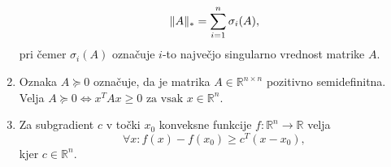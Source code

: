 \begin{enumerate}
\[          \lVert A\rVert_* = \sum_{i = 1}^{n} \sigma_i(A),
        \] pri čemer $\sigma_i(A)$ označuje $i$-to največjo singularno vrednost matrike $A$.
  \item Oznaka $A \succeq 0$ označuje, da je matrika $A \in \mathbb{R}^{n \times n}$ pozitivno semidefinitna. Velja $A \succeq 0 \iff x^TAx \ge 0 \text{ za vsak } x \in \mathbb{R}^n$. 
  \item Za subgradient $c$ v točki $x_0$ konveksne funkcije $f: \mathbb{R}^n \rightarrow \mathbb{R}$ velja
        \[
          \forall x: f(x) - f(x_0) \geq c^T(x - x_0),
        \] kjer $c \in \mathbb{R}^n$. 
\end{enumerate}






